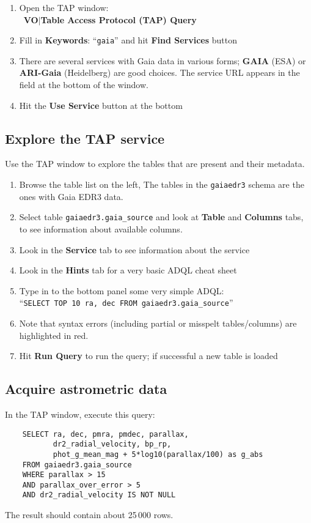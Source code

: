 \documentclass{article}
\newcommand{\buttimg}[1] %
           {\mbox{\vtop{\vskip-2ex\hbox{\includegraphics[height=3ex]
                                                        {icons/#1}}}}}
\newcommand{\lab}[1]{{\bf #1}}
\newcommand{\mb}[3]{\buttimg{#1}~\lab{#2}$\mid$\lab{#3}}
\newcommand{\entry}[2]{\lab{#1}: ``{\tt #2}''}
\begin{document}
\begin{minipage}[t]{11cm}
  \raggedright

  \begin{enumerate}
  \item Open the TAP window: \\
        \mb{tap_button.png}{VO}{Table Access Protocol (TAP) Query}
  \item Fill in \entry{Keywords}{gaia} and hit \lab{Find Services} button
  \item There are several services with Gaia data in various forms;
        \lab{GAIA} (ESA) or \lab{ARI-Gaia} (Heidelberg) are good choices.
        The service URL appears in the field at the bottom of the window.
  \item Hit the \lab{Use Service} button at the bottom
  \end{enumerate}

  \subsection{Explore the TAP service}

  Use the TAP window to explore the tables that are present and
  their metadata.
  \begin{enumerate}
  \item Browse the table list on the left,
        The tables in the {\tt gaiaedr3} schema
        are the ones with Gaia EDR3 data.
  \item Select table {\tt gaiaedr3.gaia\_source} and look at
        \lab{Table} and \lab{Columns} tabs,
        to see information about available columns.
  \item Look in the \lab{Service} tab to see information about the service
  \item Look in the \lab{Hints} tab for a very basic ADQL cheat sheet
  \item Type in to the bottom panel some very simple ADQL:\\
        ``{\tt SELECT TOP 10 ra, dec FROM gaiaedr3.gaia\_source}''
  \item Note that syntax errors (including partial or misspelt tables/columns)
        are highlighted in red.
  \item Hit \lab{Run Query} to run the query;
        if successful a new table is loaded
  \end{enumerate}

  \subsection{Acquire astrometric data}

  In the TAP window, execute this query:
  \begin{verbatim}
    SELECT ra, dec, pmra, pmdec, parallax,
           dr2_radial_velocity, bp_rp,
           phot_g_mean_mag + 5*log10(parallax/100) as g_abs
    FROM gaiaedr3.gaia_source
    WHERE parallax > 15
    AND parallax_over_error > 5
    AND dr2_radial_velocity IS NOT NULL
  \end{verbatim}
  \vspace*{-2ex}
  The result should contain about 25\,000 rows.
\end{minipage}
\end{document}
